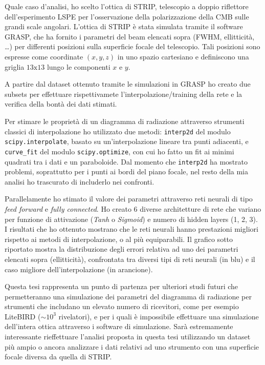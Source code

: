 \documentclass[12pt,a4paper,final]{report}			%
\begin{document}

Quale caso d'analisi, ho scelto l'ottica di STRIP, telescopio a doppio riflettore dell'esperimento LSPE per l'osservazione della polarizzazione della CMB sulle grandi scale angolari. L'ottica di STRIP è stata simulata tramite il software GRASP, che ha fornito i parametri del beam elencati sopra (FWHM, ellitticità, \ldots) per differenti posizioni sulla superficie focale del telescopio.
Tali posizioni sono espresse come coordinate $(x,y,z)$ in uno spazio cartesiano e definiscono una griglia $13\text{x}13$ lungo le componenti $x$ e $y$. 

A partire dal dataset ottenuto tramite le simulazioni in GRASP ho creato due subsets per effettuare rispettivamete l'interpolazione/training della rete e la verifica della bontà dei dati stimati.

Per stimare le proprietà di un diagramma di radiazione attraverso strumenti classici di interpolazione ho utilizzato due metodi: \texttt{interp2d} del modulo \texttt{scipy.interpolate}, basato su un'interpolazione lineare tra punti adiacenti, e \texttt{curve\_fit} del modulo \texttt{scipy.optimize}, con cui ho fatto un fit ai minimi quadrati tra i dati e un paraboloide. Dal momento che \texttt{interp2d} ha mostrato problemi, soprattutto per i punti ai bordi del piano focale, nel resto della mia analisi ho trascurato di includerlo nei confronti.


Parallelamente ho stimato il valore dei parametri attraverso reti neurali di tipo \textit{feed forward} e \textit{fully connected}.
Ho creato 6 diverse architetture di rete che variano per funzione di attivazione (\textit{Tanh} o \textit{Sigmoid}) e numero di hidden layers (1, 2, 3). 
I risultati che ho ottenuto mostrano che le reti neurali hanno prestazioni migliori rispetto ai metodi di interpolazione, o al più equiparabili.
Il grafico sotto riportato mostra la distribuzione degli errori relativa ad uno dei parametri elencati sopra (ellitticità), confrontata tra diversi tipi di reti neurali (in blu) e il caso migliore dell'interpolazione (in arancione).


Questa tesi rappresenta un punto di partenza per ulteriori studi futuri che permetteranno una simulazione dei parametri del diagramma di radiazione per strumenti che includano un elevato numero di ricevitori, come per esempio LiteBIRD ($\sim10^3$ rivelatori), e per i quali è impossibile effettuare una simulazione dell'intera ottica attraverso i software di simulazione.
Sarà estremamente interessante rieffettuare l'analisi proposta in questa tesi utilizzando un dataset più ampio o ancora analizzare i dati relativi ad uno strumento con una superficie focale diversa da quella di STRIP.
\end{document}
